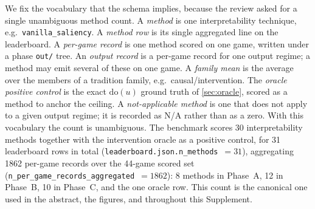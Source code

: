 We fix the vocabulary that the schema implies, because the review asked for a single
unambiguous method count. A \emph{method} is one interpretability technique, e.g.\
\texttt{vanilla\_saliency}. A \emph{method row} is its single aggregated line on the
leaderboard. A \emph{per-game record} is one method scored on one game, written under a phase
\texttt{out/} tree. An \emph{output record} is a per-game record for one output regime; a
method may emit several of these on one game. A \emph{family mean} is the average over the
members of a tradition family, e.g.\ causal/intervention. The \emph{oracle positive control}
is the exact $\mathrm{do}(u)$ ground truth of \Sectionname\ref{sec:oracle}, scored as a method to anchor the
ceiling. A \emph{not-applicable method} is one that does not apply to a given output regime;
it is recorded as N/A rather than as a zero. With this vocabulary the count is unambiguous.
The benchmark scores 30 interpretability methods together with the intervention
oracle as a positive control, for 31 leaderboard rows in total
(\texttt{leaderboard.json.n\_methods}~$=31$), aggregating 1862 per-game records over the
44-game scored set (\texttt{n\_per\_game\_records\_aggregated}~$=1862$): 8 methods in
Phase~A, 12 in Phase~B, 10 in Phase~C, and the one oracle row. This count is the canonical one
used in the abstract, the figures, and throughout this Supplement.
